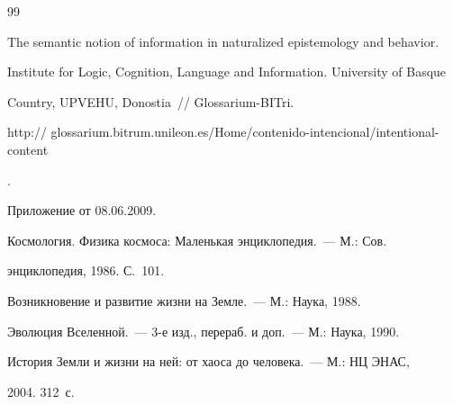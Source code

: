 {{\begin{thebibliography}{99}




The semantic notion of information in naturalized epistemology and behavior. 


Institute for Logic, Cognition, Language and Information. University of Basque 


Country, UPVEHU, Donostia~/\!\!/ Glossarium-BITri. {\sf 


http:// glossarium.bitrum.unileon.es/Home/contenido-intencional/intentional-content}. 


Приложение от 08.06.2009.







Космология. Физика космоса: Маленькая энциклопедия.~--- М.: Сов. 


энциклопедия, 1986. С.~101.












Возникновение и развитие жизни на Земле.~--- М.: Наука, 1988.









Эволюция Вселенной.~--- 3-е изд., перераб. и доп.~--- М.: Наука, 1990.





       \label{end\stat}









История Земли и жизни на ней: от хаоса до человека.~--- М.: НЦ ЭНАС, 


2004. 312~с.


\end{thebibliography}


}


}         


